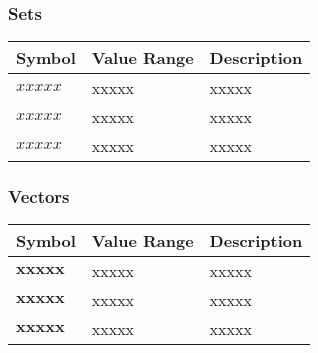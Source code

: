 \subsubsection{Sets}

\begin{longtable}{>{\raggedright\arraybackslash}p{1cm}>{\raggedright\arraybackslash}p{4cm}>{\raggedright\arraybackslash}p{9cm}}

  \hline

  \textbf{Symbol} & \textbf{Value Range} & \textbf{Description} \\

  \hline

  $xxxxx$ & xxxxx & xxxxx \\

  $xxxxx$ & xxxxx & xxxxx \\

  $xxxxx$ & xxxxx & xxxxx \\

  \hline

\end{longtable}

\subsubsection{Vectors}

\begin{longtable}{>{\raggedright\arraybackslash}p{1cm}>{\raggedright\arraybackslash}p{4cm}>{\raggedright\arraybackslash}p{9cm}}

  \hline

  \textbf{Symbol} & \textbf{Value Range} & \textbf{Description} \\

  \hline

  $\mathbf{xxxxx}$ & xxxxx & xxxxx \\

  $\mathbf{xxxxx}$ & xxxxx & xxxxx \\

  $\mathbf{xxxxx}$ & xxxxx & xxxxx \\

  \hline

\end{longtable}

